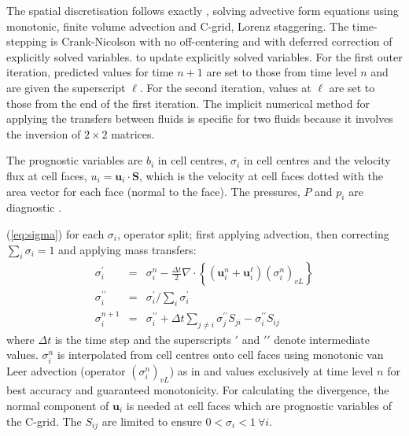 \documentclass[draft]{agujournal2019}
\begin{document}
The spatial discretisation follows exactly , solving
advective form equations using monotonic, finite volume advection
and C-grid, Lorenz staggering. The time-stepping is Crank-Nicolson
with no off-centering and with deferred correction of explicitly solved
variables.  
 to update explicitly solved variables. For the first outer
iteration, predicted values for time $n+1$ are set to those from
time level $n$ and are given the superscript $\ell$. For the second
iteration, values at $\ell$ are set to those from the end of the
first iteration. The implicit numerical method for applying the transfers
between fluids is specific for two fluids because it involves the
inversion of $2\times2$ matrices. 

The prognostic variables are  $b_{i}$ in cell centres,  $\sigma_{i}$
in cell centres and the velocity flux at cell faces, $u_{i}=\mathbf{u}_{i}\cdot\mathbf{S}$,
which is the velocity at cell faces dotted with the area vector for
each face (normal to the face). The pressures, $P$ and $p_{i}$ are
diagnostic .

(\ref{eq:sigma}) 
for each $\sigma_{i}$, operator split; first applying advection,
then correcting $\sum_{i}\sigma_{i}=1$ and  applying mass transfers:
\begin{eqnarray}
\sigma_{i}^{\prime} & = & \sigma_{i}^{n}-\frac{\Delta t}{2}\nabla\cdot\left\{ \left(\mathbf{u}_{i}^{n}+\mathbf{u}_{i}^{\ell}\right)\left(\sigma_{i}^{n}\right)_{vL}\right\}
\\
\sigma_{i}^{\prime\prime} & = & \sigma_{i}^{\prime}\bigg/\sum_{i}\sigma_{i}^{\prime}
\\
\sigma_{i}^{n+1} & = & \sigma_{i}^{\prime\prime}+\Delta t\sum_{j\ne i}\sigma_{j}^{\prime\prime}S_{ji}-\sigma_{i}^{\prime\prime}S_{ij}
\end{eqnarray}
where $\Delta t$ is the time step and the superscripts $\prime$
and $\prime\prime$ denote intermediate values. $\sigma_{i}^{n}$
is interpolated from cell centres onto cell faces using monotonic
van Leer advection (operator $(\sigma_{i}^{n})_{vL}$) as in 
and values exclusively at time level $n$ for best accuracy and guaranteed
monotonicity. For calculating the divergence, the normal component
of $\mathbf{u}_{i}$ is needed at cell faces which are prognostic
variables of the C-grid. The $S_{ij}$ are limited to ensure $0<\sigma_{i}<1\ \forall i$. 
\end{document}
